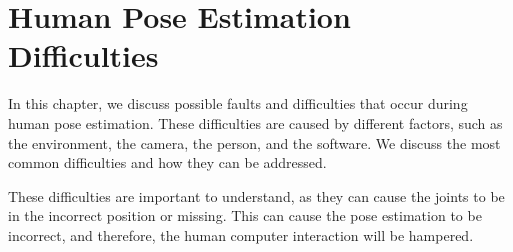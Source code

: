 \chapter{Human Pose Estimation Difficulties}
\label{sec:errors}

In this chapter, we discuss possible faults and difficulties that occur during human pose estimation. These difficulties are caused by different factors, such as the environment, the camera, the person, and the software. We discuss the most common difficulties and how they can be addressed. 

These difficulties are important to understand, as they can cause the joints to be in the incorrect position or missing. This can cause the pose estimation to be incorrect, and therefore, the human computer interaction will be hampered.




